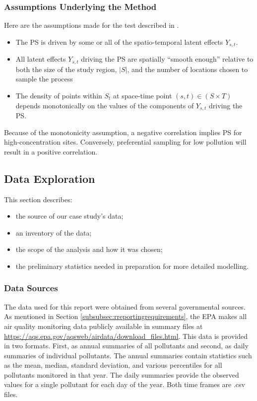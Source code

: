 \documentclass{article}
\begin{document}
\subsubsection*{Assumptions Underlying the Method}
\label{subsubsec:underlyingassumps}
Here are the assumptions made for the test described in \cite{watson2020}.
\begin{itemize}
	\item The \ac{PS} is driven by some or all of the spatio-temporal latent effects $Y_{s,t}$.
	\item  All latent effects $Y_{s,t}$ driving the \ac{PS} are spatially ``smooth enough'' relative to both the size of the study region, $|S|$, and the number of locations chosen to sample the process
	\item The density of points within $S_t$ at space-time point $(s,t) \in (S \times T)$ depends monotonically on the values of the components of $Y_{s,t}$ driving the \ac{PS}.
\end{itemize}

Because of the monotonicity assumption, a negative correlation implies \ac{PS} for high-concentration sites.  Conversely, preferential sampling for low pollution will result in a positive correlation.

%
\subsection{Data Exploration}
\label{subsec:EDA}
This section describes:
\begin{itemize}
	\item the source of our case study's data;
	\item an inventory of the data;
	\item the scope of the analysis and how it was chosen;
	\item the preliminary statistics needed in preparation for more detailed modelling.
\end{itemize}

\subsubsection*{Data Sources}\label{subsec:datasources}
The data used for this report were obtained from several governmental sources. As mentioned in Section \ref{subsubsec:rreportingrequirements}, the \ac{EPA} makes all air quality monitoring data publicly available in summary files at \url{https://aqs.epa.gov/aqsweb/airdata/download_files.html}.  This data is provided in two formats.  First, as annual summaries of all pollutants and second, as daily summaries of individual pollutants.  The annual summaries contain statistics such as the mean, median, standard deviation, and various percentiles for all pollutants monitored in that year.  The daily summaries provide the observed values for a single pollutant for each day of the year.  Both time frames are .csv files.
\end{document}
